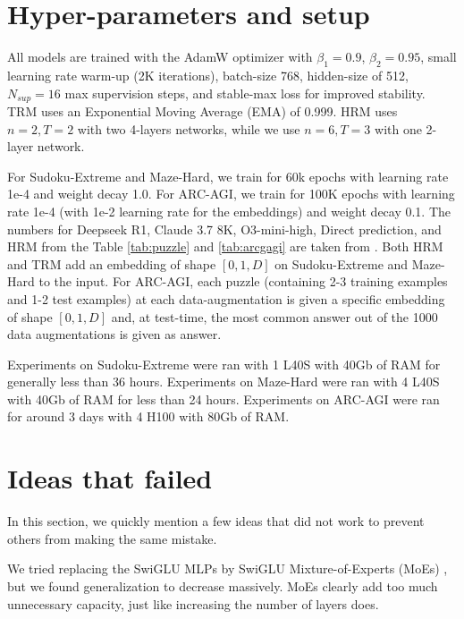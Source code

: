 \documentclass{article}
\theoremstyle{plain}
\theoremstyle{definition}
\theoremstyle{remark}
\begin{document}
\section*{Hyper-parameters and setup}\label{sec:hyper}

All models are trained with the AdamW optimizer\citep{loshchilov2017decoupled, kingma2014adam} with $\beta_1=0.9$, $\beta_2=0.95$, small learning rate warm-up (2K iterations), batch-size 768, hidden-size of 512, $N_{sup}=16$ max supervision steps, and stable-max loss \citep{prieto2025grokking} for improved stability. TRM uses an Exponential Moving Average (EMA) of 0.999. HRM uses $n=2,T=2$ with two 4-layers networks, while we use $n=6,T=3$ with one 2-layer network.

For Sudoku-Extreme and Maze-Hard, we train for 60k epochs with learning rate 1e-4 and weight decay 1.0. For ARC-AGI, we train for 100K epochs with learning rate 1e-4 (with 1e-2 learning rate for the embeddings) and weight decay 0.1. The numbers for Deepseek R1, Claude 3.7 8K, O3-mini-high, Direct prediction, and HRM from the Table \ref{tab:puzzle} and \ref{tab:arcgagi} are taken from \citet{wang2025hierarchical}. Both HRM and TRM add an embedding of shape $[0,1,D]$ on Sudoku-Extreme and Maze-Hard to the input. For ARC-AGI, each puzzle (containing 2-3 training examples and 1-2 test examples) at each data-augmentation is given a specific embedding of shape $[0,1,D]$ and, at test-time, the most common answer out of the 1000 data augmentations is given as answer.

Experiments on Sudoku-Extreme were ran with 1 L40S with 40Gb of RAM for generally less than 36 hours. Experiments on Maze-Hard were ran with 4 L40S with 40Gb of RAM for less than 24 hours. Experiments on ARC-AGI were ran for around 3 days with 4 H100 with 80Gb of RAM.

\section*{Ideas that failed}\label{sec:ideas_failed}

In this section, we quickly mention a few ideas that did not work to prevent others from making the same mistake. 

We tried replacing the SwiGLU MLPs by SwiGLU Mixture-of-Experts (MoEs) \citep{shazeer2017outrageously, fedus2022switch}, but we found generalization to decrease massively. MoEs clearly add too much unnecessary capacity, just like increasing the number of layers does.
\end{document}
